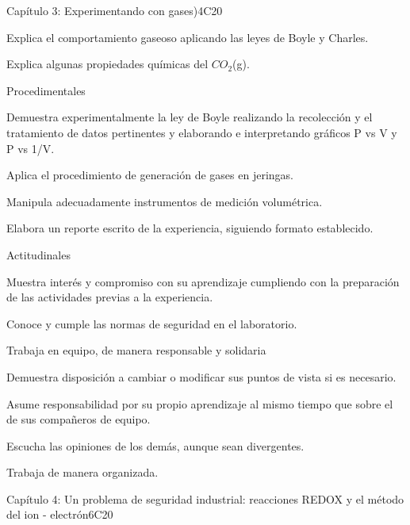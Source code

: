\begin{syllabus}
\begin{unit}{Capítulo 3: Experimentando con gases)}{}{}{4}{C20}
\begin{topics}
      \item Explica el comportamiento gaseoso aplicando las leyes de Boyle y Charles.
      \item Explica algunas propiedades químicas del $CO_2$(g).
   \end{topics}
   
   Procedimentales

\begin{topics}
      \item Demuestra experimentalmente la ley de Boyle realizando la recolección y el tratamiento de datos pertinentes y elaborando e interpretando gráficos P vs V y P vs 1/V.
      \item Aplica el procedimiento de generación de gases en jeringas.
      \item Manipula adecuadamente instrumentos de medición volumétrica. 
      \item Elabora un reporte escrito de la experiencia, siguiendo formato establecido.
   \end{topics}
   
   Actitudinales

\begin{topics}
      \item Muestra interés y compromiso con su aprendizaje cumpliendo con la preparación de las actividades previas a la experiencia.
      \item Conoce y cumple las normas de seguridad en el laboratorio.
      \item Trabaja en equipo, de manera responsable y solidaria
      \item Demuestra disposición a cambiar o modificar sus puntos de vista si es necesario.
     \item Asume responsabilidad por su propio aprendizaje al mismo tiempo que sobre el de sus compañeros de equipo.
      \item Escucha las opiniones de los demás, aunque sean divergentes.
     \item Trabaja de manera organizada.
   \end{topics}

   \begin{learningoutcomes}
      \item 
   \end{learningoutcomes}
\end{unit}

\begin{unit}{Capítulo 4: Un problema de seguridad industrial: reacciones REDOX y el método del ion - electrón}{}{}{6}{C20}


\end{unit}
\end{syllabus}
